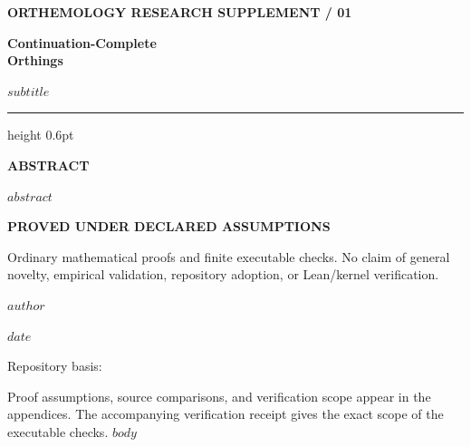 \documentclass[11pt,a4paper]{article}
\begin{document}
\begin{titlepage}
\thispagestyle{empty}
\vspace*{5mm}
{\sffamily\small\bfseries\color{ink} ORTHEMOLOGY \hfill RESEARCH SUPPLEMENT / 01\par}
\vspace{15mm}
{\sffamily\fontsize{29}{34}\selectfont\bfseries\color{ink} Continuation-Complete\\[2pt]Orthings\par}
\vspace{6mm}
{\sffamily\large\color{softink} $subtitle$\par}
\vspace{10mm}
{\color{hairline}\hrule height 0.6pt}
\vspace{8mm}
{\sffamily\small\bfseries\color{ink} ABSTRACT\par}
\vspace{2mm}
$abstract$
\vfill
{\sffamily\small\bfseries\color{ink} PROVED UNDER DECLARED ASSUMPTIONS\par}
{\small Ordinary mathematical proofs and finite executable checks. No claim of general novelty, empirical validation, repository adoption, or Lean/kernel verification.\par}
\vspace{6mm}
{\sffamily\small $author$\par}
{\sffamily\small\color{softink} $date$\par}
\vspace{4mm}
{\footnotesize Repository basis: \par}
\end{titlepage}
\tableofcontents
\vspace{8mm}
{\small\color{softink} Proof assumptions, source comparisons, and verification scope appear in the appendices. The accompanying verification receipt gives the exact scope of the executable checks.}
\clearpage
{}
$body$
\end{document}
